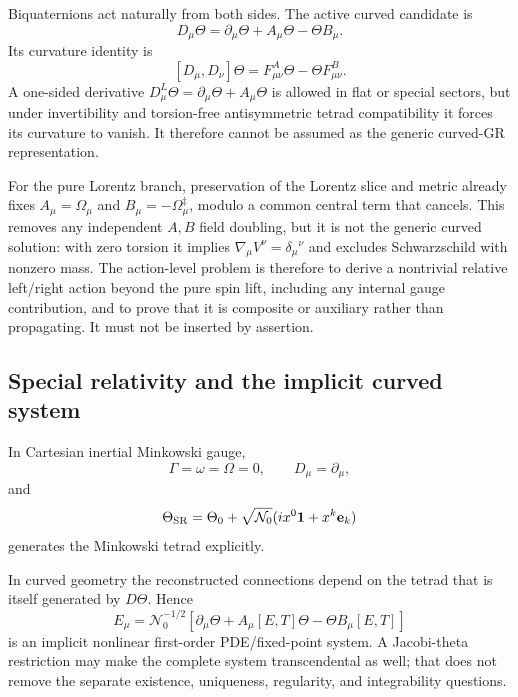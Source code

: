 Biquaternions act naturally from both sides.  The active curved candidate is
\[
 \boxed{D_\mu\Theta=\partial_\mu\Theta+A_\mu\Theta-\Theta B_\mu.}
\]
Its curvature identity is
\[
 \boxed{[D_\mu,D_\nu]\Theta
 =F^A_{\mu\nu}\Theta-\Theta F^B_{\mu\nu}.}
\]
A one-sided derivative $D^L_\mu\Theta=\partial_\mu\Theta+A_\mu\Theta$ is
allowed in flat or special sectors, but under invertibility and torsion-free
antisymmetric tetrad compatibility it forces its curvature to vanish.  It
therefore cannot be assumed as the generic curved-GR representation.

For the pure Lorentz branch, preservation of the Lorentz slice and metric
already fixes $A_\mu=\Omega_\mu$ and
$B_\mu=-\Omega_\mu^\ddagger$, modulo a common central term that cancels.
This removes any independent $A,B$ field doubling, but it is not the generic
curved solution: with zero torsion it implies
$\nabla_\mu V^\nu=\delta_\mu{}^\nu$ and excludes Schwarzschild with
nonzero mass.  The action-level problem is therefore to derive a nontrivial
relative left/right action beyond the pure spin lift, including any internal
gauge contribution, and to prove that it is composite or auxiliary rather than
propagating.  It must not be inserted by assertion.

\subsection{Special relativity and the implicit curved system}

In Cartesian inertial Minkowski gauge,
\[
 \Gamma=\omega=\Omega=0,
 \qquad D_\mu=\partial_\mu,
\]
and
\[
 \Theta_{\rm SR}=\Theta_0+\sqrt{\mathcal N_0}
 (ix^0\mathbf1+x^k\mathbf e_k)
\]
generates the Minkowski tetrad explicitly.

In curved geometry the reconstructed connections depend on the tetrad that is
itself generated by $D\Theta$.  Hence
\[
 E_\mu=\mathcal N_0^{-1/2}
 [\partial_\mu\Theta+A_\mu[E,T]\Theta-\Theta B_\mu[E,T]]
\]
is an implicit nonlinear first-order PDE/fixed-point system.  A Jacobi-theta
restriction may make the complete system transcendental as well; that does not
remove the separate existence, uniqueness, regularity, and integrability
questions.
